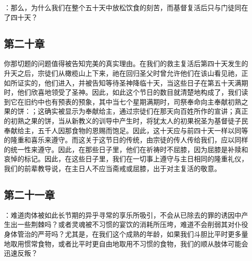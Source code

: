 \par

：那么，为什么我们在整个五十天中放松饮食的刻苦，而基督复活后只与门徒同在了四十天？\par


\subsection{第二十章}

\par

你那切题的问题值得被告知完美的真实理由。在我们的救主复活后第四十天发生的升天之后，宗徒们从橄榄山上下来，祂在回归圣父时曾允许他们在该山看见祂，正如所证实的，他们进入，并被告知等待圣神降临十天，当这些日子在第五十天满期时，他们欣喜地领受了圣神。因此，如此这个节日的数目就清楚地构成了，我们读到它在旧约中也有预表的预象，其中当七个星期满期时，司祭奉命向主奉献初熟之果的饼：；这确实被显示为奉献给主，通过宗徒们在那天向百姓所作的宣讲；真正的初熟之果的饼，当从新教义的训导中产生时，将犹太人的初果祝圣为基督徒子民奉献给主，五千人因那食物的恩赐而饱足。因此，这十天应与前四十天一样以同等的隆重和喜乐来遵守。而这关于这节日的传统，由宗徒的传人传给我们，应以同样的统一性来遵守。因此，在那些日子里，他们在祈祷时不屈膝，因为屈膝是补赎和哀悼的标记。因此，在这些日子里，我们在一切事上遵守与主日相同的隆重礼仪，我们的前辈教导说，在主日人不应当斋戒或屈膝，出于对主复活的敬意。\par


\subsection{第二十一章}

\par

：难道肉体被如此长节期的异乎寻常的享乐所吸引，不会从已除去的罪的诱因中产生出一些荆棘吗？或者灵魂被不习惯的宴饮的消耗所压垮，难道不会削弱其对仆役身体管治的严苛吗？尤其是，在我们这个成熟的年龄，如果我们斗胆比平时更多量地取用惯常食物，或者比平时更自由地取用不习惯的食物，我们的顺从肢体可能会迅速反叛？\par

